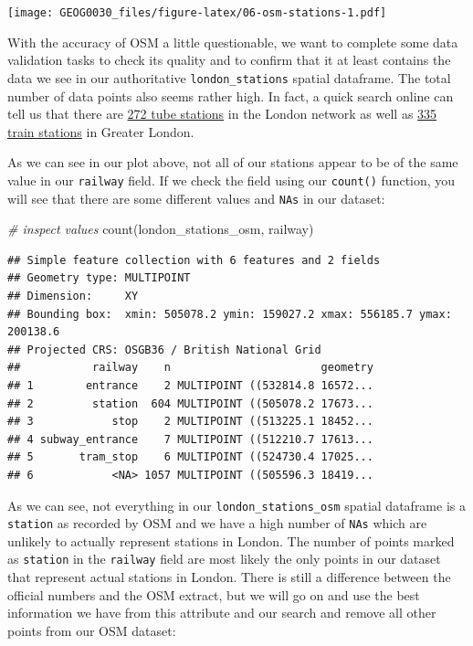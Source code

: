 \documentclass[
]{book}
\newenvironment{Shaded}{\begin{snugshade}}{\end{snugshade}}
\newcommand{\CommentTok}[1]{\textcolor[rgb]{0.56,0.35,0.01}{\textit{#1}}}
\newcommand{\FunctionTok}[1]{\textcolor[rgb]{0.00,0.00,0.00}{#1}}
\newcommand{\NormalTok}[1]{#1}
\begin{document}
\texttt{[image: GEOG0030\_files/figure-latex/06-osm-stations-1.pdf]}

With the accuracy of OSM a little questionable, we want to complete some data validation tasks to check its quality and to confirm that it at least contains the data we see in our authoritative \texttt{london\_stations} spatial dataframe. The total number of data points also seems rather high. In fact, a quick search online can tell us that there are \href{https://tfl.gov.uk/corporate/about-tfl/what-we-do}{272 tube stations} in the London network as well as \href{https://en.wikipedia.org/wiki/List_of_London_railway_stations}{335 train stations} in Greater London.

As we can see in our plot above, not all of our stations appear to be of the same value in our \texttt{railway} field. If we check the field using our \texttt{count()} function, you will see that there are some different values and \texttt{NAs} in our dataset:

\begin{Shaded}
\begin{Highlighting}[]
\CommentTok{\# inspect values}
\FunctionTok{count}\NormalTok{(london\_stations\_osm, railway)}
\end{Highlighting}
\end{Shaded}

\begin{verbatim}
## Simple feature collection with 6 features and 2 fields
## Geometry type: MULTIPOINT
## Dimension:     XY
## Bounding box:  xmin: 505078.2 ymin: 159027.2 xmax: 556185.7 ymax: 200138.6
## Projected CRS: OSGB36 / British National Grid
##           railway    n                       geometry
## 1        entrance    2 MULTIPOINT ((532814.8 16572...
## 2         station  604 MULTIPOINT ((505078.2 17673...
## 3            stop    2 MULTIPOINT ((513225.1 18452...
## 4 subway_entrance    7 MULTIPOINT ((512210.7 17613...
## 5       tram_stop    6 MULTIPOINT ((524730.4 17025...
## 6            <NA> 1057 MULTIPOINT ((505596.3 18419...
\end{verbatim}

As we can see, not everything in our \texttt{london\_stations\_osm} spatial dataframe is a \texttt{station} as recorded by OSM and we have a high number of \texttt{NAs} which are unlikely to actually represent stations in London. The number of points marked as \texttt{station} in the \texttt{railway} field are most likely the only points in our dataset that represent actual stations in London. There is still a difference between the official numbers and the OSM extract, but we will go on and use the best information we have from this attribute and our search and remove all other points from our OSM dataset:
\end{document}
